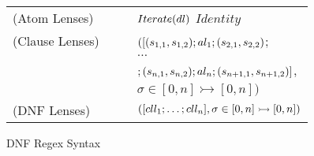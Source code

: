 \begin{figure}
\begin{tabular}{l@{\ }l@{\ }c@{\ }l}

(Atom Lenses) &\AtomLens{} & \GEq{} & $Iterate(dl)$ \GBar{} $Identity$ \\
(Clause Lenses) &\ClauseLens{} & \GEq{} & $([(s_{1,1},s_{1,2}); al_1 ; (s_{2,1},s_{2,2}) $;\\
& & & $\ldots$\\
& & & $; (s_{n,1},s_{n,2}) ; al_n ; (s_{n+1,1},s_{n+1,2})]$,\\
& & & $\sigma \in [0,n] \rightarrowtail [0,n])$\\
(DNF Lenses)& \DNFLens{} & \GEq{} & $([cll_1 ; \ldots ; cll_n], \sigma \in [0,n] \rightarrowtail [0,n])$ \\
\end{tabular}
\caption{DNF Regex Syntax}
\label{fig:dnf-lens-syntax}
\end{figure}
